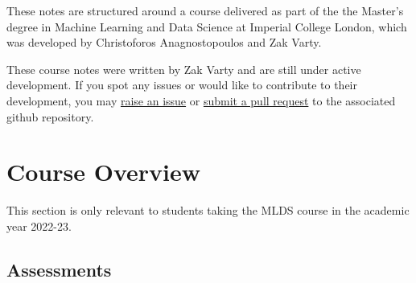 \documentclass[
]{book}
\theoremstyle{definition}
\theoremstyle{definition}
\theoremstyle{definition}
\theoremstyle{definition}
\theoremstyle{remark}
\begin{document}
These notes are structured around a course delivered as part of the the Master's degree in Machine Learning and Data Science at Imperial College London, which was developed by Christoforos Anagnostopoulos and Zak Varty.

These course notes were written by Zak Varty and are still under active development. If you spot any issues or would like to contribute to their development, you may \href{https://github.com/zakvarty/ethics-1/issues}{raise an issue} or \href{https://github.com/zakvarty/ethics-1/pulls}{submit a pull request} to the associated github repository.

\hypertarget{course-overview}{%
\chapter*{Course Overview}\label{course-overview}}

This section is only relevant to students taking the MLDS course in the
academic year 2022-23.

\hypertarget{assessments}{%
\section{Assessments}\label{assessments}}
\end{document}
